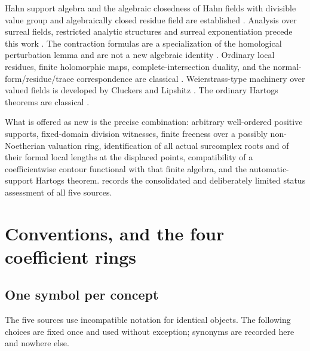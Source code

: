 \documentclass[11pt,letterpaper]{article}
\theoremstyle{definition}
\theoremstyle{remark}
\numberwithin{equation}{section}
\begin{document}
Hahn support algebra and the algebraic closedness of Hahn fields with divisible value group and algebraically closed residue field are established \cite{finite:Neumann,finite:Poonen}. Analysis over surreal fields, restricted analytic structures and surreal exponentiation precede this work \cite{finite:Alling,finite:vdDE,finite:BM}. The contraction formulas are a specialization of the homological perturbation lemma and are not a new algebraic identity \cite{finite:Crainic}. Ordinary local residues, finite holomorphic maps, complete-intersection duality, and the normal-form/residue/trace correspondence are classical \cite{finite:Cartan,finite:GunningRossi,finite:GriffithsHarris,finite:Hartshorne,finite:Kunz,finite:Demailly,finite:CDS,finite:CattaniDickenstein,finite:Cox,finite:NayakSastry}. Weierstrass-type machinery over valued fields is developed by Cluckers and Lipshitz \cite{finite:CluckersLipshitz}. The ordinary Hartogs theorems are classical \cite{finite:Lebl,finite:BK}.

What is offered as new is the precise combination: arbitrary well-ordered positive supports, fixed-domain division witnesses, finite freeness over a possibly non-Noetherian valuation ring, identification of all actual surcomplex roots and of their formal local lengths at the displaced points, compatibility of a coefficientwise contour functional with that finite algebra, and the automatic-support Hartogs theorem.  records the consolidated and deliberately limited status assessment of all five sources.

\section{Conventions, and the four coefficient rings}
\label{finite:sec:conventions}

\subsection{One symbol per concept}
\label{finite:sec:notation}

The five sources use incompatible notation for identical objects. The following choices are fixed once and used without exception; synonyms are recorded here and nowhere else.
\end{document}
